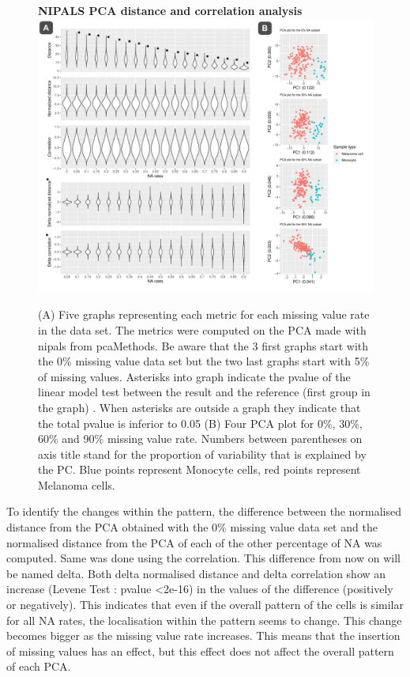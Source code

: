 \documentclass[a4paper, 11pt, twocolumn]{article}
\begin{document}
\begin{figure}[!ht]
    \textbf{NIPALS PCA distance and correlation analysis}
    \centering
    \includegraphics[width = \linewidth]{nipals_merged.pdf}
    \caption{\small (A) Five graphs representing each metric for each missing value rate in the data set. \scriptsize The metrics were computed on the PCA made with nipals from pcaMethods. Be aware that the 3 first graphs start with the 0\% missing value data set but the two last graphs start with 5\% of missing values. Asterisks into graph indicate the pvalue of the linear model test between the result and the reference (first group in the graph) . When asterisks are outside a graph they indicate that the total pvalue is inferior to 0.05
    \small (B) Four PCA plot for 0\%, 30\%, 60\% and 90\% missing value rate. \scriptsize Numbers between parentheses on axis title stand for the proportion of variability that is explained by the PC. Blue points represent Monocyte cells, red points represent Melanoma cells.
    }
    \label{corr_dist_nipals}
\end{figure}

To identify the changes within the pattern, the difference between the normalised distance from the PCA obtained with the 0\% missing value data set and the normalised distance from the PCA of each of the other percentage of NA was computed. Same was done using the correlation. This difference from now on will be named delta. Both delta normalised distance and delta correlation show an increase (Levene Test : pvalue <2e-16) in the values of the difference (positively or negatively). This indicates that even if the overall pattern of the cells is similar for all NA rates, the localisation within the pattern seems to change. This change becomes bigger as the missing value rate increases. This means that the insertion of missing values has an effect, but this effect does not affect the overall pattern of each PCA. 
\end{document}
